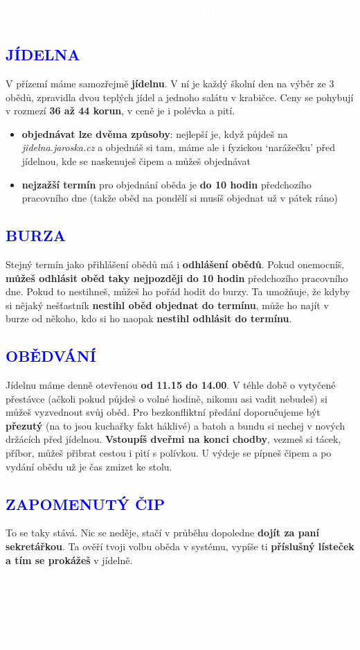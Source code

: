 \documentclass{article}
\newcommand{\nadpisf}[1]{
\vspace*{-60pt}
  \begin{nadpisboxf}
    \vspace*{20pt}
    \centering \section*{\textcolor{white}{#1}}
  \end{nadpisboxf}
}
\newcommand{\podnadpisf}[1]{
  \subsection*{\textcolor{blue}{#1}}
}
\begin{document}
\newpage

\nadpisf{FORMÁLNÍ ZÁLEŽITOSTI}
\noindent \podnadpisf{JÍDELNA}
V přízemí máme samozřejmě \textbf{jídelnu}. V ní je každý školní den na výběr ze 3 obědů, zpravidla dvou teplých jídel a jednoho salátu v krabičce. Ceny se pohybují v rozmezí \textbf{36 až 44 korun}, v ceně je i polévka a pití.

\begin{itemize}[leftmargin=10pt]
  \item \textbf{objednávat lze dvěma způsoby}: nejlepší je, když půjdeš na \textit{jidelna.jaroska.cz} a objednáš si tam, máme ale i fyzickou ‘narážečku’ před jídelnou, kde se naskenuješ čipem a můžeš objednávat
  \item \textbf{nejzažší termín} pro objednání oběda je \textbf{do 10 hodin} předchozího pracovního dne (takže oběd na pondělí si musíš objednat už v pátek ráno)
\end{itemize}

\podnadpisf{BURZA}
Stejný termín jako přihlášení obědů má i \textbf{odhlášení obědů}. Pokud onemocníš, \textbf{můžeš odhlásit oběd taky nejpozději do 10 hodin} předchozího pracovního dne. Pokud to nestihneš, můžeš ho pořád hodit do burzy. Ta umožňuje, že kdyby si nějaký nešťastník \textbf{nestihl oběd objednat do termínu}, může ho najít v burze od někoho, kdo si ho naopak \textbf{nestihl odhlásit do termínu}.

\podnadpisf{OBĚDVÁNÍ}
Jídelnu máme denně otevřenou \textbf{od 11.15 do 14.00}. V téhle době o vytyčené přestávce (ačkoli pokud půjdeš o volné hodině, nikomu asi vadit nebudeš) si
můžeš vyzvednout svůj oběd. Pro bezkonfliktní předání doporučujeme být \textbf{přezutý} (na to jsou kuchařky fakt háklivé) a batoh a bundu si nechej v nových držácích před jídelnou. \textbf{Vstoupíš dveřmi na konci chodby}, vezmeš si tácek, příbor, můžeš přibrat cestou i pití s polívkou. U výdeje se pípneš čipem a po vydání obědu už je čas zmizet ke stolu.

\podnadpisf{ZAPOMENUTÝ ČIP}
To se taky stává. Nic se neděje, stačí v průběhu dopoledne \textbf{dojít za paní
sekretářkou}. Ta ověří tvoji volbu oběda v systému, vypíše ti \textbf{příslušný lísteček
a tím se prokážeš} v jídelně.

\begin{bluebox}
  \textcolor{white}{\footnotesize
  ‘v jídelně jsme si všichni rovni’ aneb jeden podpultový tip:\\
  v případě úplně nejhoršího scénáře, kdy si zapomeneš objednat jídlo a v burze nic není, můžeš zkusit dojít čtvrt hodiny před druhou a hodit na kuchařky psí oči, třeba ti něco dají. a i když se nevyvede s hlavním chodem, většinou ti dovolí vzít si polívku. (ale od nás to nemáš!)}
\end{bluebox}
\end{document}
